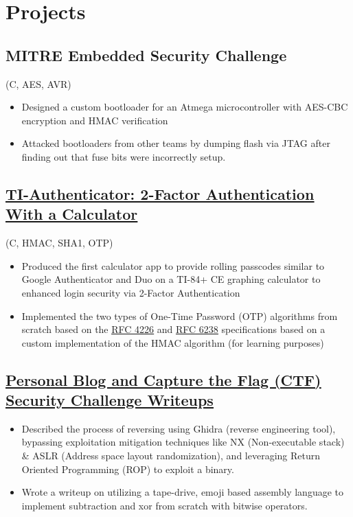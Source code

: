 \documentclass{article}
\begin{document}
\section{Projects}

\subsection{MITRE Embedded Security Challenge} \hfill (C, AES, AVR)
\begin{itemize}
    \item Designed a custom bootloader for an Atmega microcontroller with AES-CBC encryption and HMAC verification
    \item Attacked bootloaders from other teams by dumping flash via JTAG after finding out that fuse bits were incorrectly setup.
\end{itemize}

\subsection{\href{https://github.com/jshin313/ti-authenticator}{\underline{TI-Authenticator: 2-Factor Authentication With a Calculator}}} \hfill (C, HMAC, SHA1, OTP)
\begin{itemize}
    \item Produced the first calculator app to provide rolling passcodes similar to Google Authenticator and Duo on a TI-84+ CE graphing calculator to enhanced login security via 2-Factor Authentication
    \item Implemented the two types of One-Time Password (OTP) algorithms from scratch based on the \href{https://tools.ietf.org/html/rfc4226}{\underline{RFC 4226}} and \href{https://tools.ietf.org/html/rfc6238}{\underline{RFC 6238}} specifications based on a custom implementation of the HMAC algorithm (for learning purposes)
\end{itemize}

\subsection{\href{https://jacobshin.com/posts/}{ \underline{Personal Blog and Capture the Flag (CTF) Security Challenge Writeups}}}
\begin{itemize}
    \item Described the process of reversing using Ghidra (reverse engineering tool), bypassing exploitation mitigation techniques like NX (Non-executable stack) \& ASLR (Address space layout randomization), and leveraging Return Oriented Programming (ROP) to exploit a binary.
    \item Wrote a writeup on utilizing a tape-drive, emoji based assembly language to implement subtraction and xor from scratch with bitwise operators.
\end{itemize}
\end{document}
